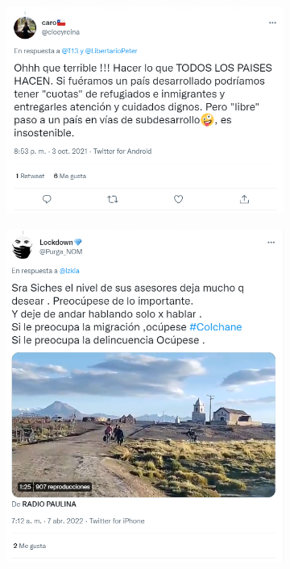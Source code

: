 \begin{figure}[H]
\begin{subfigure}{0.49\textwidth}
            \end{subfigure}
        \hfill
            \begin{subfigure}{0.49\textwidth}
                \centering
                \includegraphics[width=.99\linewidth]{figs/tweet_general_4.png}
            \end{subfigure}%
            \begin{subfigure}{0.49\textwidth}
                \centering
                \includegraphics[width=.99\linewidth]{figs/tweet_general_5.png}
            \end{subfigure}
        

\end{figure}

